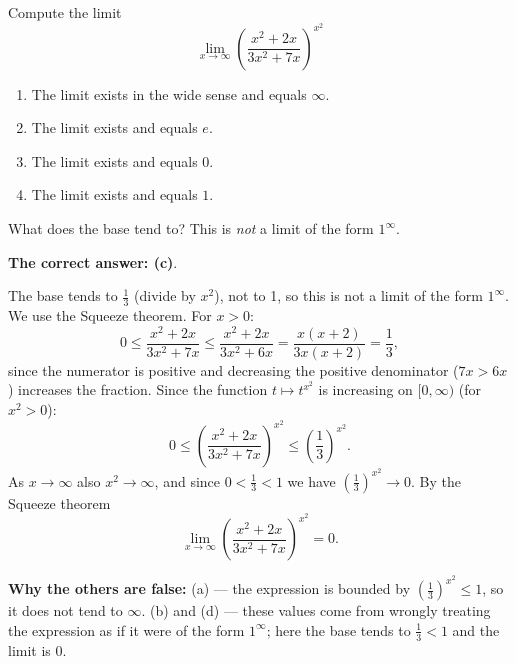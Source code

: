 
\begin{question}
Compute the limit
\[
\lim_{x\to\infty}\left(\frac{x^2+2x}{3x^2+7x}\right)^{x^2}
\]
\begin{enumerate}
  \item The limit exists in the wide sense and equals $\infty$.
  \item The limit exists and equals $e$.
  \item The limit exists and equals $0$.
  \item The limit exists and equals $1$.
\end{enumerate}
\end{question}

\begin{hint}
What does the base tend to? This is \emph{not} a limit of the form $1^\infty$.
\end{hint}

\begin{solution}
\textbf{The correct answer: (c)}.

The base tends to $\frac13$ (divide by $x^2$), not to 1, so this is not a limit of the form $1^\infty$. We use the Squeeze theorem. For $x>0$:
\[
0\le\frac{x^2+2x}{3x^2+7x}\le\frac{x^2+2x}{3x^2+6x}=\frac{x(x+2)}{3x(x+2)}=\frac13 ,
\]
since the numerator is positive and decreasing the positive denominator ($7x>6x$) increases the fraction. Since the function $t\mapsto t^{x^2}$ is increasing on $[0,\infty)$ (for $x^2>0$):
\[
0\le\left(\frac{x^2+2x}{3x^2+7x}\right)^{x^2}\le\left(\frac13\right)^{x^2}.
\]
As $x\to\infty$ also $x^2\to\infty$, and since $0<\frac13<1$ we have $\left(\frac13\right)^{x^2}\to0$. By the Squeeze theorem
\[
\lim_{x\to\infty}\left(\frac{x^2+2x}{3x^2+7x}\right)^{x^2}=\boxed{0}.
\]

\textbf{Why the others are false:} (a) --- the expression is bounded by $\left(\frac13\right)^{x^2}\le1$, so it does not tend to $\infty$. (b) and (d) --- these values come from wrongly treating the expression as if it were of the form $1^\infty$; here the base tends to $\frac13<1$ and the limit is 0.
\end{solution}
